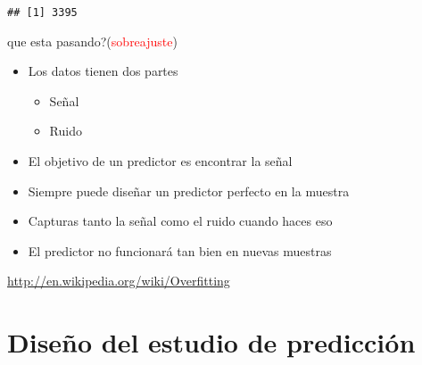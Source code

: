 \documentclass[
]{article}
\providecommand{\tightlist}{%
  \setlength{\itemsep}{0pt}\setlength{\parskip}{0pt}}
\begin{document}
\begin{verbatim}
## [1] 3395
\end{verbatim}

que esta pasando?(\textcolor{red}{sobreajuste})

\begin{itemize}
\tightlist
\item
  Los datos tienen dos partes

  \begin{itemize}
  \tightlist
  \item
    Señal
  \item
    Ruido
  \end{itemize}
\item
  El objetivo de un predictor es encontrar la señal
\item
  Siempre puede diseñar un predictor perfecto en la muestra
\item
  Capturas tanto la señal como el ruido cuando haces eso
\item
  El predictor no funcionará tan bien en nuevas muestras
\end{itemize}

\url{http://en.wikipedia.org/wiki/Overfitting}

\hypertarget{diseuxf1o-del-estudio-de-predicciuxf3n}{%
\section{Diseño del estudio de
predicción}\label{diseuxf1o-del-estudio-de-predicciuxf3n}}
\end{document}
